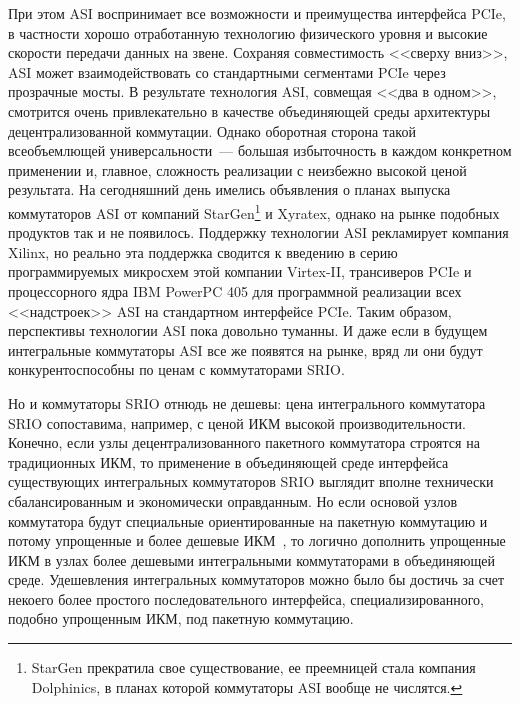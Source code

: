 \begin{multicols}{2}
     При этом ASI воспринимает все возможности и преимущества интерфейса PCIe, в 
частности хорошо отработанную технологию физического уровня и высокие скорости 
передачи данных на звене. Сохраняя совместимость <<сверху вниз>>, ASI может 
взаимодействовать со стандартными сегментами PCIe через прозрачные мосты. В результате 
технология ASI, совмещая <<два в одном>>, смотрится очень привлекательно в качестве 
объединяющей среды архитектуры децентрализованной коммутации. Однако оборотная 
сторона  такой всеобъемлющей универсальности~--- большая избыточность в\linebreak
каждом 
конкретном применении и, главное, сложность реализации с неизбежно высокой ценой 
результата. На сегодняшний день имелись объявления о планах выпуска коммутаторов ASI 
от\linebreak
компаний StarGen\footnote{StarGen прекратила свое существование, ее преемницей стала 
компания Dolphinics, в планах которой коммутаторы ASI вообще не числятся.} и Xyratex, 
однако на рынке подобных продуктов так и не появилось. Поддержку технологии ASI 
рекламирует компания Xilinx, но реально эта поддержка сводится к введению в серию 
программируемых микросхем этой компании Virtex-II, трансиверов PCIe и процессорного 
ядра IBM PowerPC 405 для программной реализации всех <<надстроек>> ASI на 
стандартном интерфейсе PCIe. Таким образом, перспективы технологии ASI пока довольно 
туманны. И даже если в будущем интегральные коммутаторы ASI все же появятся на рынке, 
вряд ли они будут конкурентоспособны по ценам с коммутаторами SRIO.
     
     Но и коммутаторы SRIO отнюдь не дешевы: цена интегрального коммутатора SRIO 
сопоставима, например, с ценой ИКМ высокой производительности. Конечно, если узлы 
децентрализованного пакетного коммутатора строятся на традиционных ИКМ, то 
применение в объединяющей среде интерфейса существующих интегральных коммутаторов 
SRIO выглядит вполне технически сбалансированным и экономически оправданным. Но 
если основой узлов коммутатора будут специальные ориентированные на пакетную 
коммутацию и потому упрощенные и более дешевые ИКМ~\cite{8eg}, то логично дополнить 
упрощенные ИКМ в узлах более дешевыми интегральными коммутаторами в объединяющей 
среде. Удешевления интегральных коммутаторов можно было бы достичь за счет некоего 
более простого последовательного интерфейса,  
специализированного, подобно упрощенным ИКМ, под пакетную коммутацию.

\vspace*{-6pt}


\end{multicols}

